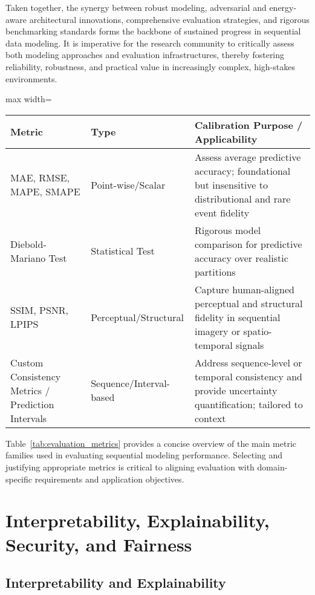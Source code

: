 Taken together, the synergy between robust modeling, adversarial and energy-aware architectural innovations, comprehensive evaluation strategies, and rigorous benchmarking standards forms the backbone of sustained progress in sequential data modeling. It is imperative for the research community to critically assess both modeling approaches and evaluation infrastructures, thereby fostering reliability, robustness, and practical value in increasingly complex, high-stakes environments.

\begin{table*}[htbp]
\centering
\caption{Overview of Key Evaluation Metrics for Sequential Data Modeling}
\label{tab:evaluation_metrics}
\begin{adjustbox}{max width=\textwidth}
\begin{tabular}{lll}
\toprule
\textbf{Metric} & \textbf{Type} & \textbf{Calibration Purpose / Applicability} \\
\midrule
MAE, RMSE, MAPE, SMAPE & Point-wise/Scalar & Assess average predictive accuracy; foundational but insensitive to distributional and rare event fidelity \\
Diebold-Mariano Test & Statistical Test & Rigorous model comparison for predictive accuracy over realistic partitions \\
SSIM, PSNR, LPIPS & Perceptual/Structural & Capture human-aligned perceptual and structural fidelity in sequential imagery or spatio-temporal signals \\
Custom Consistency Metrics / Prediction Intervals & Sequence/Interval-based & Address sequence-level or temporal consistency and provide uncertainty quantification; tailored to context \\
\bottomrule
\end{tabular}
\end{adjustbox}
\end{table*}

Table~\ref{tab:evaluation_metrics} provides a concise overview of the main metric families used in evaluating sequential modeling performance. Selecting and justifying appropriate metrics is critical to aligning evaluation with domain-specific requirements and application objectives.

\section{Interpretability, Explainability, Security, and Fairness}

\subsection{Interpretability and Explainability}


